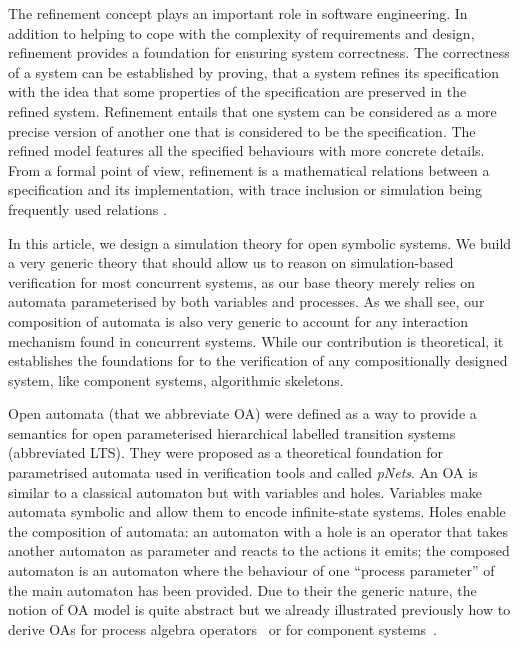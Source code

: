 \documentclass[runningheads]{llncs}
\begin{document}
The refinement concept  plays  an important role in software engineering. In addition to helping to cope with the complexity of requirements and design, refinement provides a foundation for ensuring  system  correctness. The correctness of a system can
be established by proving, that a system refines its specification with the idea that some properties of the specification are preserved in the refined system.
Refinement entails that one system  can be considered as a more precise version of another one that is considered to be the specification. The refined model features all the specified behaviours with more concrete details. From a formal point of view,  refinement is a mathematical relations between a specification and its implementation, with trace inclusion or simulation being frequently used relations  \cite{Milner:1980,Kouchnarenko:2007}.

In this article, we design a simulation theory for open symbolic systems.  We build a very generic theory that should allow us to reason on simulation-based verification for most concurrent systems, as our base theory merely relies on automata parameterised by both variables and processes. As we shall see, our composition of automata is also very generic to account for any interaction mechanism found in concurrent systems.
While our contribution is theoretical, it establishes the foundations for to the verification of any compositionally designed system, like  component systems, algorithmic skeletons.



Open automata (that we abbreviate OA) were defined as a way to provide a semantics for open parameterised hierarchical labelled transition systems (abbreviated LTS). They were proposed as a theoretical foundation for parametrised automata used in verification tools and called \emph{pNets}.
An OA \cite{henrio:01299562} is similar to a classical automaton but with variables and holes. Variables make automata symbolic and allow them to encode infinite-state systems. Holes enable the composition of automata: an automaton with a hole is an operator that takes another automaton as parameter and reacts to the actions it emits; the composed automaton is an automaton where the behaviour of one ``process parameter'' %
 of the main automaton has been provided.
Due to their the generic nature, the notion of OA model is quite abstract but we already illustrated previously how to derive OAs for process algebra operators~\cite{henrio:01299562} or for component systems~\cite{AMHEEMA:2023,ameurboulifa:01526055}.
\end{document}
